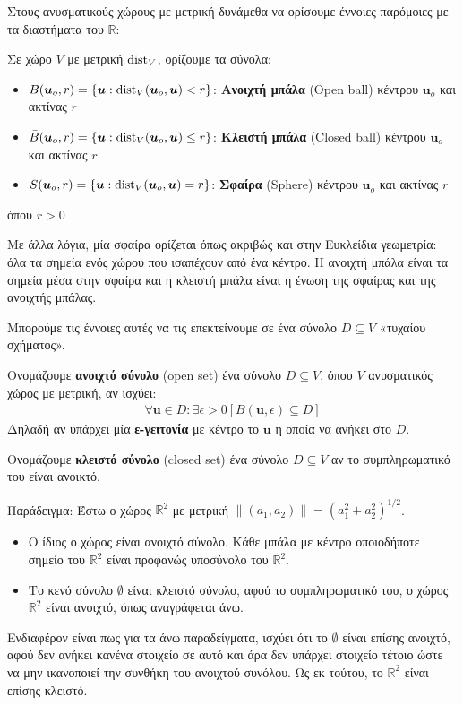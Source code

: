 \documentclass[main.tex]{subfiles}
\begin{document}
	Στους ανυσματικούς χώρους με μετρική δυνάμεθα να ορίσουμε έννοιες παρόμοιες με τα διαστήματα του $\mathbb{R}$:
	\begin{definition}
		Σε χώρο $V$ με μετρική $\operatorname{dist}_V$, ορίζουμε τα σύνολα:
		\begin{itemize}
			\item $B(\boldsymbol{u}_o, r) = \left\{\boldsymbol{u} : \operatorname{dist}_V(\boldsymbol{u}_o,\boldsymbol{u}) < r\right\}$: \textbf{Ανοιχτή μπάλα} (Open ball) κέντρου $\boldsymbol{u}_o$ και ακτίνας $r$
			\item $\bar{B}(\boldsymbol{u}_o, r) = \left\{\boldsymbol{u} : \operatorname{dist}_V(\boldsymbol{u}_o,\boldsymbol{u}) \leq r\right\}$: \textbf{Κλειστή μπάλα} (Closed ball) κέντρου $\boldsymbol{u}_o$ και ακτίνας $r$
			\item $S(\boldsymbol{u}_o, r) = \left\{\boldsymbol{u} : \operatorname{dist}_V(\boldsymbol{u}_o,\boldsymbol{u}) = r\right\}$: \textbf{Σφαίρα} (Sphere) κέντρου $\boldsymbol{u}_o$ και ακτίνας $r$
		\end{itemize}
		όπου $r > 0$
	\end{definition}
	Με άλλα λόγια, μία σφαίρα ορίζεται όπως ακριβώς και στην Ευκλείδια γεωμετρία: όλα τα σημεία ενός χώρου που ισαπέχουν από ένα κέντρο. Η ανοιχτή μπάλα είναι τα σημεία μέσα στην σφαίρα και η κλειστή μπάλα είναι η ένωση της σφαίρας και της ανοιχτής μπάλας.
	
	Μπορούμε τις έννοιες αυτές να τις επεκτείνουμε σε ένα σύνολο $D\subseteq V$ «τυχαίου σχήματος».
	
	\begin{definition}
		Ονομάζουμε \textbf{ανοιχτό σύνολο} (open set) ένα σύνολο ${D \subseteq V}$, όπου $V$ ανυσματικός χώρος με μετρική, αν ισχύει:
		\begin{align*}
			\forall\boldsymbol{u}\in D:\exists\epsilon > 0[B(\boldsymbol{u},\epsilon)\subseteq D]
		\end{align*}
		Δηλαδή αν υπάρχει μία \textbf{ε-γειτονία} με κέντρο το $\boldsymbol{u}$ η οποία να ανήκει στο $D$.
	\end{definition}

	\begin{definition}
		Ονομάζουμε \textbf{κλειστό σύνολο} (closed set) ένα σύνολο ${D \subseteq V}$ αν το συμπληρωματικό του είναι ανοικτό.
	\end{definition}

	Παράδειγμα: Έστω ο χώρος $\mathbb{R}^2$ με μετρική $\|(a_1, a_2)\| = (a_1^2 + a_2^2)^{1/2}$.
	\begin{itemize}
		\item O ίδιος ο χώρος είναι ανοιχτό σύνολο. Κάθε μπάλα με κέντρο οποιοδήποτε σημείο του $\mathbb{R}^2$ είναι προφανώς υποσύνολο του $\mathbb{R}^2$.
		\item Το κενό σύνολο $\emptyset$ είναι κλειστό σύνολο, αφού το συμπληρωματικό του, ο χώρος $\mathbb{R}^2$ είναι ανοιχτό, όπως αναγράφεται άνω.
	\end{itemize}
	Ενδιαφέρον είναι πως για τα άνω παραδείγματα, ισχύει ότι το $\emptyset$ είναι επίσης ανοιχτό, αφού δεν ανήκει κανένα στοιχείο σε αυτό και άρα δεν υπάρχει στοιχείο τέτοιο ώστε να μην ικανοποιεί την συνθήκη του ανοιχτού συνόλου. Ως εκ τούτου, το $\mathbb{R}^2$ είναι επίσης κλειστό.
	
\end{document}
